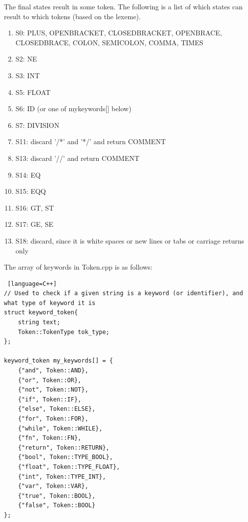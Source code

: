 The final states result in some token. The following is a list of which states can result to which tokens (based on the lexeme).
\begin{enumerate}
	\item S0: PLUS, OPEN\textunderscore BRACKET, CLOSED\textunderscore BRACKET, OPEN\textunderscore BRACE, CLOSED\textunderscore BRACE, COLON, SEMI\textunderscore COLON, COMMA, TIMES
	\item S2: NE
	\item S3: INT
	\item S5: FLOAT
	\item S6: ID (or one of mykeywords[] below)
	\item S7: DIVISION
	\item S11: discard '/*' and '*/' and return COMMENT
	\item S13: discard '//' and return COMMENT
	\item S14: EQ
	\item S15: EQQ
	\item S16: GT, ST
	\item S17: GE, SE
	\item S18: discard, since it is white spaces or new lines or tabs or carriage returns only
\end{enumerate}

\bigskip

The array of keywords in Token.cpp is as follows:
\begin{lstlisting} [language=C++]
// Used to check if a given string is a keyword (or identifier), and what type of keyword it is
struct keyword_token{
	string text;
	Token::TokenType tok_type;
};

keyword_token my_keywords[] = {
	{"and", Token::AND},
	{"or", Token::OR},
	{"not", Token::NOT},
	{"if", Token::IF},
	{"else", Token::ELSE},
	{"for", Token::FOR},
	{"while", Token::WHILE},
	{"fn", Token::FN},
	{"return", Token::RETURN},
	{"bool", Token::TYPE_BOOL},
	{"float", Token::TYPE_FLOAT},
	{"int", Token::TYPE_INT},
	{"var", Token::VAR},
	{"true", Token::BOOL},
	{"false", Token::BOOL}
};
\end{lstlisting}

